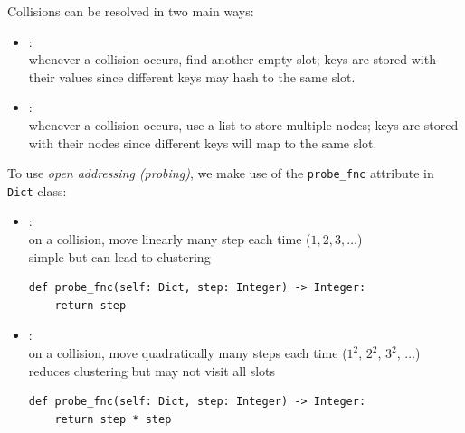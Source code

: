 \documentclass[mathserif, handout]{beamer}
\begin{document}
\begin{frame}
	Collisions can be resolved in two main ways:
	\begin{itemize}
		\item {}: \\ \footnotesize\color{gray} whenever a collision occurs, find another empty slot; keys are stored with their values since different keys may hash to the same slot. \normalsize\color{black}
		\item {}: \\
		      \footnotesize\color{gray}
		      whenever a collision occurs, use a list to store multiple nodes; keys are stored with their nodes since different keys will map to the same slot.
		      \normalsize\color{black}
	\end{itemize}
\end{frame}

\begin{frame}[fragile]
	To use \textit{open addressing (probing)}, we make use of the \texttt{probe\_fnc} attribute in \texttt{Dict} class:
	\begin{itemize}
		\item {}: \\
		      \footnotesize\color{gray} on a collision, move linearly many step each time ($1, 2, 3, \dots$) \\
		      simple but can lead to clustering \normalsize\color{black}
		      \begin{lstlisting}[style=mypython]
def probe_fnc(self: Dict, step: Integer) -> Integer:
    return step
\end{lstlisting}

		\item {}: \\
		      \footnotesize\color{gray} on a collision, move quadratically many steps each time ($1^2$, $2^2$, $3^2$, $\dots$) \\
		      reduces clustering but may not visit all slots \normalsize\color{black}
		      \begin{lstlisting}[style=mypython]
def probe_fnc(self: Dict, step: Integer) -> Integer:
    return step * step
\end{lstlisting}
	\end{itemize}
\end{frame}
\end{document}

